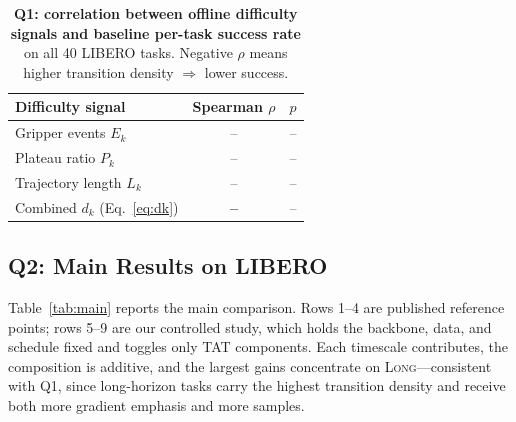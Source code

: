 \documentclass[letterpaper]{article} %
\newcommand{\method}{TAT} %
\newcommand{\libero}{LIBERO}
\newcommand{\na}{--}      %
\begin{document}
\begin{table}[t]
\centering
\begin{tabular}{lcc}
\toprule
Difficulty signal & Spearman $\rho$ & $p$ \\
\midrule
Gripper events $E_k$        & \na{} & \na{} \\
Plateau ratio $P_k$         & \na{} & \na{} \\
Trajectory length $L_k$     & \na{} & \na{} \\
\midrule
Combined $d_k$ (Eq.~\ref{eq:dk}) & \textbf{\na{}} & \na{} \\
\bottomrule
\end{tabular}
\caption{\textbf{Q1: correlation between offline difficulty signals and baseline per-task success rate} on all 40 \libero{} tasks. Negative $\rho$ means higher transition density $\Rightarrow$ lower success. %
}
\label{tab:hypothesis}
\end{table}

\subsection{Q2: Main Results on \libero{}}
Table~\ref{tab:main} reports the main comparison. Rows 1--4 are published reference points; rows 5--9 are our controlled study, which holds the backbone, data, and schedule fixed and toggles only \method{} components. Each timescale contributes, the composition is additive, and the largest gains concentrate on \textsc{Long}---consistent with Q1, since long-horizon tasks carry the highest transition density and receive both more gradient emphasis and more samples.
\end{document}
